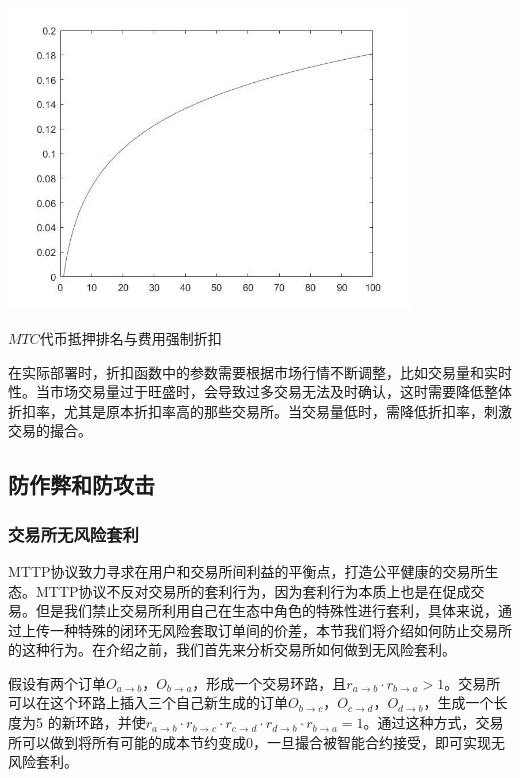 \documentclass[UTF8,nofonts]{ctexart}
\makeatletter
\newenvironment{figurehere}
  {\def\@captype{figure}}
  {}
\makeatother
\begin{document}
\begin{center}
\begin{figurehere}
\includegraphics[height=8cm]{images/exchange-discount.png}

\caption{$MTC$代币抵押排名与费用强制折扣}
\label{fig:discount}

\end{figurehere}
\end{center}

在实际部署时，折扣函数中的参数需要根据市场行情不断调整，比如交易量和实时性。当市场交易量过于旺盛时，会导致过多交易无法及时确认，这时需要降低整体折扣率，尤其是原本折扣率高的那些交易所。当交易量低时，需降低折扣率，刺激交易的撮合。

\subsection{防作弊和防攻击}

\subsubsection{交易所无风险套利}
MTTP协议致力寻求在用户和交易所间利益的平衡点，打造公平健康的交易所生态。MTTP协议不反对交易所的套利行为，因为套利行为本质上也是在促成交易。但是我们禁止交易所利用自己在生态中角色的特殊性进行套利，具体来说，通过上传一种特殊的闭环无风险套取订单间的价差，本节我们将介绍如何防止交易所的这种行为。在介绍之前，我们首先来分析交易所如何做到无风险套利。

假设有两个订单$O_{a\rightarrow b}$，$O_{b\rightarrow a}$，形成一个交易环路，且$r_{a\rightarrow b} \cdot r_{b\rightarrow a} > 1$。交易所可以在这个环路上插入三个自己新生成的订单$O_{b\rightarrow c}$，$O_{c\rightarrow d}$，$O_{d\rightarrow b}$，生成一个长度为5
的新环路，并使$r_{a\rightarrow b}  \cdot r_{b\rightarrow c} \cdot r_{c\rightarrow d}\cdot r_{d\rightarrow b}\cdot r_{b\rightarrow a}  = 1$。通过这种方式，交易所可以做到将所有可能的成本节约变成0，一旦撮合被智能合约接受，即可实现无风险套利。
\end{document}
